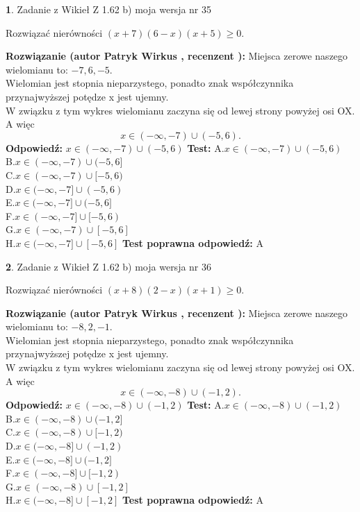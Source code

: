\documentclass[12pt, a4paper]{article}
\theoremstyle{definition} %
\newtheorem{zad}{}
\newcommand{\zadStart}[1]{\begin{zad}#1\newline}
\newcommand{\zadStop}{\end{zad}}
\newcommand{\rozwStart}[2]{\noindent \textbf{Rozwiązanie (autor #1 , recenzent #2): }\newline}
\newcommand{\rozwStop}{\newline}
\newcommand{\odpStart}{\noindent \textbf{Odpowiedź:}\newline}
\newcommand{\odpStop}{\newline}
\newcommand{\testStart}{\noindent \textbf{Test:}\newline}
\newcommand{\testStop}{\newline}
\newcommand{\kluczStart}{\noindent \textbf{Test poprawna odpowiedź:}\newline}
\newcommand{\kluczStop}{\newline}
\begin{document}
\zadStart{Zadanie z Wikieł Z 1.62 b) moja wersja nr 35}

Rozwiązać nierówności $(x+7)(6-x)(x+5)\ge0$.
\zadStop
\rozwStart{Patryk Wirkus}{}
Miejsca zerowe naszego wielomianu to: $-7, 6, -5$.\\
Wielomian jest stopnia nieparzystego, ponadto znak współczynnika przy\linebreak najwyższej potędze x jest ujemny.\\ W związku z tym wykres wielomianu zaczyna się od lewej strony powyżej osi OX. A więc $$x \in (-\infty,-7) \cup (-5,6).$$
\rozwStop
\odpStart
$x \in (-\infty,-7) \cup (-5,6)$
\odpStop
\testStart
A.$x \in (-\infty,-7) \cup (-5,6)$\\
B.$x \in (-\infty,-7) \cup (-5,6]$\\
C.$x \in (-\infty,-7) \cup [-5,6)$\\
D.$x \in (-\infty,-7] \cup (-5,6)$\\
E.$x \in (-\infty,-7] \cup (-5,6]$\\
F.$x \in (-\infty,-7] \cup [-5,6)$\\
G.$x \in (-\infty,-7) \cup [-5,6]$\\
H.$x \in (-\infty,-7] \cup [-5,6]$
\testStop
\kluczStart
A
\kluczStop



\zadStart{Zadanie z Wikieł Z 1.62 b) moja wersja nr 36}

Rozwiązać nierówności $(x+8)(2-x)(x+1)\ge0$.
\zadStop
\rozwStart{Patryk Wirkus}{}
Miejsca zerowe naszego wielomianu to: $-8, 2, -1$.\\
Wielomian jest stopnia nieparzystego, ponadto znak współczynnika przy\linebreak najwyższej potędze x jest ujemny.\\ W związku z tym wykres wielomianu zaczyna się od lewej strony powyżej osi OX. A więc $$x \in (-\infty,-8) \cup (-1,2).$$
\rozwStop
\odpStart
$x \in (-\infty,-8) \cup (-1,2)$
\odpStop
\testStart
A.$x \in (-\infty,-8) \cup (-1,2)$\\
B.$x \in (-\infty,-8) \cup (-1,2]$\\
C.$x \in (-\infty,-8) \cup [-1,2)$\\
D.$x \in (-\infty,-8] \cup (-1,2)$\\
E.$x \in (-\infty,-8] \cup (-1,2]$\\
F.$x \in (-\infty,-8] \cup [-1,2)$\\
G.$x \in (-\infty,-8) \cup [-1,2]$\\
H.$x \in (-\infty,-8] \cup [-1,2]$
\testStop
\kluczStart
A
\kluczStop
\end{document}
